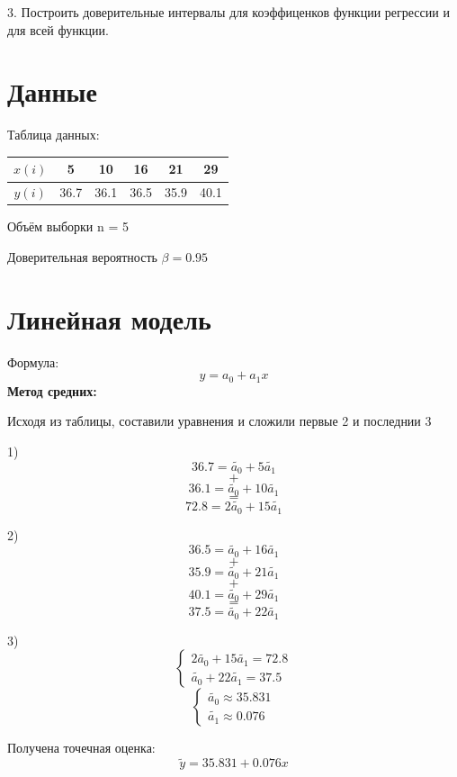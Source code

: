 \documentclass{article}
\begin{document}
3. Построить доверительные интервалы для коэффиценков функции регрессии и для всей функции.
\section*{Данные }
Таблица данных:

\begin{table}[H]
    \centering
    \begin{tabular}{|c|c|c|c|c|c|}
    \hline
    $x(i)$&  5&  10&  16& 21& 29\\
    \hline
    $y(i)$&  36.7&  36.1&  36.5& 35.9& 40.1\\
    \hline
    \end{tabular}
\end{table}

Объём выборки n = 5

Доверительная вероятность $\beta = 0.95$

\section*{Линейная модель}
Формула:
\[y = a_0 + a_1x\]
\textbf{Метод средних:}

Исходя из таблицы, составили уравнения и сложили первые 2 и последнии 3

1)
\[36.7 = \tilde{a_0} + 5 \tilde{a_1}\]
\[+\]
\[36.1 = \tilde{a_0} + 10 \tilde{a_1}\]
\[=\]
\[72.8 = 2\tilde{a_0} + 15\tilde{a_1}\]

2)
\[36.5 = \tilde{a_0} + 16 \tilde{a_1}\]
\[+\]
\[35.9 = \tilde{a_0} + 21 \tilde{a_1}\]
\[+\]
\[40.1 = \tilde{a_0} + 29 \tilde{a_1}\]
\[=\]
\[37.5 = \tilde{a_0} + 22 \tilde{a_1}\]

3)
\[\begin{cases}
    2\tilde{a_0} + 15\tilde{a_1} = 72.8 \\
     \tilde{a_0} + 22 \tilde{a_1} = 37.5 
\end{cases}\]
\[\begin{cases}
    \tilde{a_0} \approx 35.831\\
    \tilde{a_1} \approx 0.076
\end{cases}\]

Получена точечная оценка:
\[\tilde{y} = 35.831 + 0.076x\]
\end{document}
